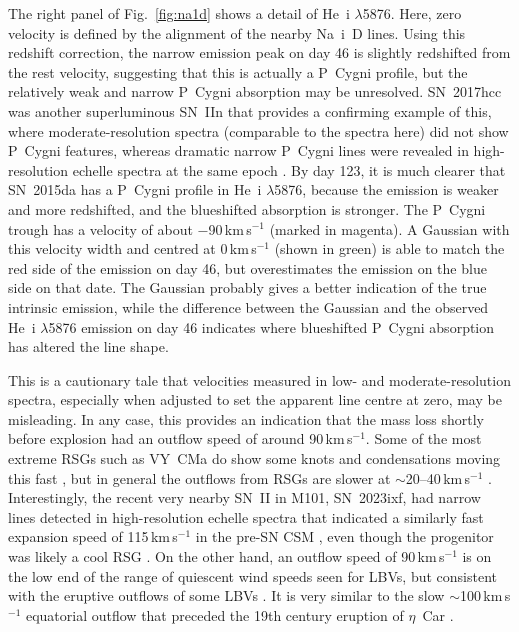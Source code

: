 \documentclass[fleqn,usenatbib,useAMS]{mnras}
\begin{document}
The right panel of Fig.~\ref{fig:na1d} shows a detail of He~{\sc i} $\lambda$5876.  Here, zero velocity is defined by the alignment of the nearby Na~{\sc i}~D lines.  Using this redshift correction, the narrow emission peak on day 46 is slightly redshifted from the rest velocity, suggesting that this is actually a P~Cygni profile, but the relatively weak and narrow P~Cygni absorption may be unresolved.  SN~2017hcc was another superluminous SN~IIn that provides a confirming example of this, where moderate-resolution spectra (comparable to the spectra here) did not show P~Cygni features, whereas dramatic narrow P~Cygni lines were revealed in high-resolution echelle spectra at the same epoch \citep{smith20}.  By day 123, it is much clearer that SN~2015da has a P~Cygni profile in He~{\sc i} $\lambda$5876, because the emission is weaker and more redshifted, and the blueshifted absorption is stronger.  The P~Cygni trough has a velocity of about $-$90\,km\,s$^{-1}$ (marked in magenta).  A Gaussian with this velocity width and centred at 0\,km\,s$^{-1}$ (shown in green) is able to match the red side of the emission on day 46, but overestimates the emission on the blue side on that date.   The Gaussian probably gives a better indication of the true intrinsic emission, while the difference between the Gaussian and the observed He~{\sc i} $\lambda$5876 emission on day 46 indicates where blueshifted P~Cygni absorption has altered the line shape.  

This is a cautionary tale that velocities measured in low- and moderate-resolution spectra, especially when adjusted to set the apparent line centre at zero, may be misleading.  In any case, this provides an indication that the mass loss shortly before explosion had an outflow speed of around 90\,km\,s$^{-1}$.  Some of the most extreme RSGs such as VY~CMa do show some knots and condensations moving this fast \citep{smith04}, but in general the outflows from RSGs are slower at $\sim$20--40\,km\,s$^{-1}$ \citep{ry98,beasor20}.  Interestingly, the recent very nearby SN~II in M101, SN~2023ixf, had narrow lines detected in high-resolution echelle spectra that indicated a similarly fast expansion speed of 115\,km\,s$^{-1}$ in the pre-SN CSM \citep{smith23}, even though the progenitor was likely a cool RSG \citep{jencson23,kilpatrick23,griffin23,ps23}.  On the other hand, an outflow speed of 90\,km\,s$^{-1}$ is on the low end of the range of quiescent wind speeds seen for LBVs, but consistent with the eruptive outflows of some LBVs \citep{smith14,smith11lbv}.  It is very similar to the slow $\sim$100\,km\,s$^{-1}$ equatorial outflow that preceded the 19th century eruption of $\eta$~Car \citep{smith18}.
\end{document}
